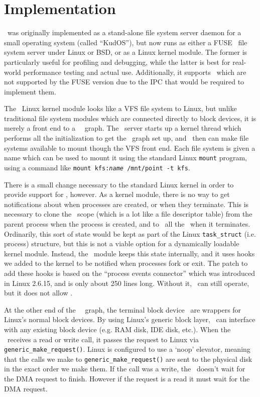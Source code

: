 \section{Implementation}
\label{sec:implementation}

\Kudos\ was originally implemented as a stand-alone file system server daemon
for a small operating system (called ``KudOS''), but now runs as either a
FUSE~\cite{fuse} file system server under Linux or BSD, or as a Linux kernel
module. The former is particularly useful for profiling and debugging, while the
latter is best for real-world performance testing and actual use. Additionally,
it supports \opgroups\ which are not supported by the FUSE version due to the
IPC that would be required to implement them.

The \Kudos\ Linux kernel module looks like a VFS file system to Linux, but
unlike traditional file system modules which are connected directly to block
devices, it is merely a front end to a \Kudos\ \module\ graph. The \Kudos\
server starts up a kernel thread which performs all the initialization to get
the \module\ graph set up, and \modules\ then can make file systems available to
mount though the VFS front end. Each file system is given a name which can be
used to mount it using the standard Linux \texttt{mount} program, using a
command like \mbox{\texttt{mount kfs:\textit{name} /mnt/point -t kfs}}.

There is a small change necessary to the standard Linux kernel in order to
provide support for \opgroups, however. As a kernel module, there is no way to
get notifications about when processes are created, or when they terminate. This
is necessary to clone the \opgroup\ scope (which is a lot like a file descriptor
table) from the parent process when the process is created, and to \abandon\ all
the \opgroups\ when it terminates. Ordinarily, this sort of state would be kept
as part of the Linux \texttt{task\_struct} (i.e. process) structure, but this is
not a viable option for a dynamically loadable kernel module. Instead, the
\Kudos\ module keeps this state internally, and it uses hooks we added to the
kernel to be notified when processes fork or exit. The patch to add these hooks
is based on the ``process events connector'' which was introduced in Linux
2.6.15, and is only about 250 lines long. Without it, \Kudos\ can still operate,
but it does not allow \opgroups.

At the other end of the \Kudos\ \module\ graph, the terminal block device
\modules\ are wrappers for Linux's normal block devices. By using Linux's
generic block layer, \Kudos\ can interface with any existing block device (e.g.
RAM disk, IDE disk, etc.). When the \module\ receives a read or write call, it
passes the request to Linux via \texttt{generic\_make\_request()}. Linux is
configured to use a `noop' elevator, meaning that the calls we make to
\texttt{generic\_make\_request()} are sent to the physical disk in the exact
order we make them. If the call was a write, the \module\ doesn't wait for the
DMA request to finish. However if the request is a read it must wait for the DMA
request.

